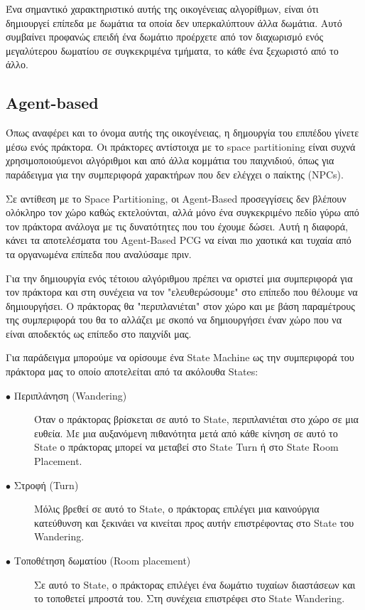 Ένα σημαντικό χαρακτηριστικό αυτής της οικογένειας αλγορίθμων, είναι ότι δημιουργεί επίπεδα με δωμάτια τα οποία δεν υπερκαλύπτουν άλλα δωμάτια. Αυτό συμβαίνει προφανώς επειδή ένα δωμάτιο προέρχετε από τον διαχωρισμό ενός μεγαλύτερου δωματίου σε συγκεκριμένα τμήματα, το κάθε ένα ξεχωριστό από το άλλο.

\subsection{Agent-based}
Όπως αναφέρει και το όνομα αυτής της οικογένειας, η δημουργία του επιπέδου γίνετε μέσω ενός πράκτορα. Οι πράκτορες αντίστοιχα με το space partitioning είναι συχνά χρησιμοποιούμενοι αλγόριθμοι και από άλλα κομμάτια του παιχνιδιού, όπως για παράδειγμα για την συμπεριφορά χαρακτήρων που δεν ελέγχει ο παίκτης (NPCs).
\par
Σε αντίθεση με το Space Partitioning, οι Agent-Based προσεγγίσεις δεν βλέπουν ολόκληρο τον χώρο καθώς εκτελούνται, αλλά μόνο ένα συγκεκριμένο πεδίο γύρω από τον πράκτορα ανάλογα με τις δυνατότητες που του έχουμε δώσει. Αυτή η διαφορά, κάνει τα αποτελέσματα του Agent-Based PCG να είναι πιο χαοτικά και τυχαία από τα οργανωμένα επίπεδα που αναλύσαμε πριν.
\par
Για την δημιουργία ενός τέτοιου αλγόριθμου πρέπει να οριστεί μια συμπεριφορά για τον πράκτορα και στη συνέχεια να τον "ελευθερώσουμε" στο επίπεδο που θέλουμε να δημιουργήσει. Ο πράκτορας θα "περιπλανιέται" στον χώρο και με βάση παραμέτρους της συμπεριφορά του θα το αλλάζει με σκοπό να δημιουργήσει έναν χώρο που να είναι αποδεκτός ως επίπεδο στο παιχνίδι μας.
\par
Για παράδειγμα μπορούμε να ορίσουμε ένα State Machine ως την συμπεριφορά του πράκτορα μας το οποίο αποτελείται από τα ακόλουθα States:
\begin{description}
  \item[$\bullet$ Περιπλάνηση (Wandering)] Όταν ο πράκτορας βρίσκεται σε αυτό το State, περιπλανιέται στο χώρο σε μια ευθεία. Με μια αυξανόμενη πιθανότητα μετά από κάθε κίνηση σε αυτό το State ο πράκτορας μπορεί να μεταβεί στο State Turn ή στο State Room Placement.
  \item[$\bullet$ Στροφή (Turn)] Μόλις βρεθεί σε αυτό το State, ο πράκτορας επιλέγει μια καινούργια κατεύθυνση και ξεκινάει να κινείται προς αυτήν επιστρέφοντας στο State του Wandering. 
    \item[$\bullet$ Τοποθέτηση δωματίου (Room placement)] Σε αυτό το State, ο πράκτορας επιλέγει ένα δωμάτιο τυχαίων διαστάσεων και το τοποθετεί μπροστά του. Στη συνέχεια επιστρέφει στο State Wandering.
\end{description}
